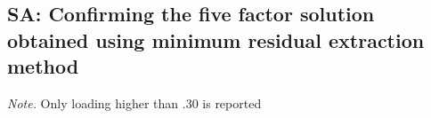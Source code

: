 \clearpage
\makeatletter
\efloat@restorefloats
\makeatother


\begin{appendix}
\hypertarget{sa-confirming-the-five-factor-solution-obtained-using-minimum-residual-extraction-method}{%
\section{SA: Confirming the five factor solution obtained using minimum
residual extraction
method}\label{sa-confirming-the-five-factor-solution-obtained-using-minimum-residual-extraction-method}}

\begin{center}
\begin{ThreePartTable}

\begin{TableNotes}[para]
\normalsize{\textit{Note.} Only loading higher than .30 is reported}
\end{TableNotes}


\end{ThreePartTable}
\end{center}
\end{appendix}
